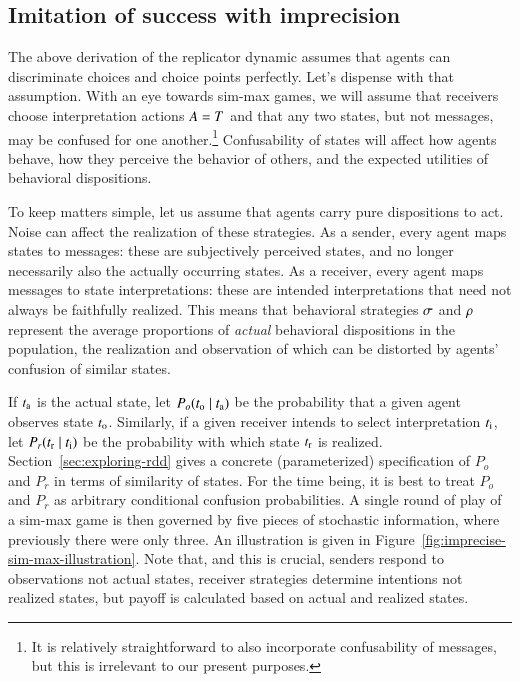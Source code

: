 \documentclass[fleqn,reqno,10pt]{article}
\begin{document}
\subsection{Imitation of success with imprecision}
\label{sec:imit-succ-with}

The above derivation of the replicator dynamic assumes that agents can discriminate choices and
choice points perfectly. Let's dispense with that assumption. With an eye towards sim-max
games, we will assume that receivers choose interpretation actions $A = T$ and that
any two states, but not messages, may be confused for one another.\footnote{It is relatively
  straightforward to also incorporate confusability of messages, but this is irrelevant to our
  present purposes.} Confusability of states will affect how agents behave, how they perceive
the behavior of others, and the expected utilities of behavioral dispositions.

To keep matters simple, let us assume that agents carry pure dispositions to act. Noise can
affect the realization of these strategies. As a sender, every agent maps states to messages:
these are subjectively perceived states, and no longer necessarily also the actually occurring
states. As a receiver, every agent maps messages to state interpretations: these are intended
interpretations that need not always be faithfully realized. This means that behavioral
strategies $\sigma$ and $\rho$ represent the average proportions of \emph{actual}
behavioral dispositions in the population, the realization and observation of which can be
distorted by agents' confusion of similar states.

If $t_{\mathrm{a}}$ is the actual state, let $P_o(t_{\mathrm{o}} \mid t_{\mathrm{a}})$ be the
probability that a given agent observes state $t_{\mathrm{o}}$. Similarly, if a given receiver
intends to select interpretation $t_{\mathrm{i}}$, let $P_r(t_{\mathrm{r}} \mid t_{\mathrm{i}})$ be
the probability with which state $t_{\mathrm{r}}$ is realized.  Section~\ref{sec:exploring-rdd}
gives a concrete (parameterized) specification of $P_o$ and $P_r$ in terms of similarity of
states. For the time being, it is best to treat $P_o$ and $P_r$ as arbitrary conditional
confusion probabilities.
A single round of play of a sim-max game is then governed by five pieces of stochastic
information, where previously there were only three.
An illustration is given in Figure~\ref{fig:imprecise-sim-max-illustration}.
Note that, and this is crucial, senders respond to observations not actual states, receiver strategies determine intentions not realized states, but payoff is calculated based on actual and realized states.
\end{document}
